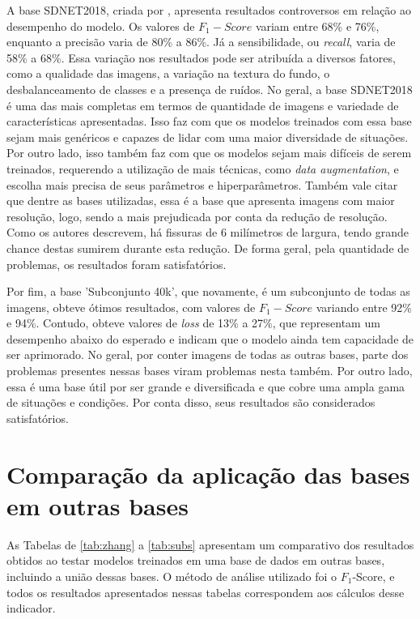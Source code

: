 A base SDNET2018, criada por , apresenta resultados controversos em relação ao desempenho do modelo. 
Os valores de $F_{1}-Score$ variam entre 68\% e 76\%, enquanto a precisão varia de 80\% a 86\%. 
Já a sensibilidade, ou \textit{recall}, varia de 58\% a 68\%. 
Essa variação nos resultados pode ser atribuída a diversos fatores, como a qualidade das imagens, a variação na textura do fundo, o desbalanceamento de classes e a presença de ruídos.
No geral, a base SDNET2018 é uma das mais completas em termos de quantidade de imagens e variedade de características apresentadas.
Isso faz com que os modelos treinados com essa base sejam mais genéricos e capazes de lidar com uma maior diversidade de situações.
Por outro lado, isso também faz com que os modelos sejam mais difíceis de serem treinados, requerendo a utilização de mais técnicas, como \textit{data augmentation}, e escolha mais precisa de seus parâmetros e hiperparâmetros.
Também vale citar que dentre as bases utilizadas, essa é a base que apresenta imagens com maior resolução, logo, sendo a mais prejudicada por conta da redução de resolução.
Como os autores  descrevem, há fissuras de 6 milímetros de largura, tendo grande chance destas sumirem durante esta redução.
De forma geral, pela quantidade de problemas, os resultados foram satisfatórios.

Por fim, a base 'Subconjunto 40k', que novamente, é um subconjunto de todas as imagens, obteve ótimos resultados, com valores de $F_{1}-Score$ variando entre 92\% e 94\%.
Contudo, obteve valores de \textit{loss} de 13\% a 27\%, que representam um desempenho abaixo do esperado e indicam que o modelo ainda tem capacidade de ser aprimorado.
No geral, por conter imagens de todas as outras bases, parte dos problemas presentes nessas bases viram problemas nesta também.
Por outro lado, essa é uma base útil por ser grande e diversificada e que cobre uma ampla gama de situações e condições.
Por conta disso, seus resultados são considerados satisfatórios.

\section{Comparação da aplicação das bases em outras bases}


As Tabelas de \ref{tab:zhang} a \ref{tab:subs} apresentam um comparativo dos resultados obtidos ao testar modelos treinados em uma base de dados em outras bases, incluindo a união dessas bases.
O método de análise utilizado foi o $F_{1}$-Score, e todos os resultados apresentados nessas tabelas correspondem aos cálculos desse indicador.

